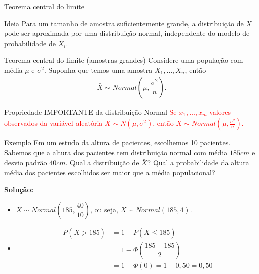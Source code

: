 \documentclass[9pt]{beamer}
\begin{document}
\begin{frame}{Teorema central do limite}
\begin{block}{Ideia}
 Para um tamanho de amostra suficientemente grande, a distribuição de $\bar{X}$ pode ser aproximada por uma distribuição normal, independente do modelo de probabilidade de $X_i$.
\end{block}
\vfill

\begin{block}{Teorema central do limite (amostras grandes)}
 Considere uma população com média $\mu$ e $\sigma^2$. Suponha que temos uma amostra $X_1, \dots, X_n$, então
 \begin{align*}
  \bar{X}  \sim Normal\left(\mu, \dfrac{\sigma^2}{n} \right).
 \end{align*}
\end{block}
\vfill

\begin{block}{Propriedade IMPORTANTE da distribuição Normal}
	\textcolor{red}{Se $x_1, \dots, x_m$ valores observados da variável aleatória $X \sim N(\mu, \sigma^2)$, então  $\bar{X} \sim Normal\left( \mu, \frac{\sigma^2}{n} \right)$.}
\end{block}
\end{frame}

\begin{frame}{Exemplo}
Em um estudo da altura de pacientes, escolhemos 10 pacientes. Sabemos que a altura dos pacientes tem distribuição normal com média $185cm$ e desvio padrão $40cm$. Qual a distribuição de $\bar{X}$?
Qual a probabilidade da altura média dos pacientes escolhidos ser maior que a média populacional?
\vfill

\textbf{Solução:}

\begin{itemize}
	\item $\bar{X} \sim Normal\left( 185, \dfrac{40}{10}  \right) $, ou seja, $\bar{X} \sim Normal\left( 185, 4 \right)$.
	\vfill
	
	\item
	\begin{align*}
	P(\bar{X} > 185) &= 1 - P(\bar{X} \leq 185)\\
	&= 1 - \Phi\left( \dfrac{185-185}{2} \right)\\
	&= 1 - \Phi(0) = 1 - 0,50 = 0,50
	\end{align*}
\end{itemize}


\end{frame}
\end{document}
